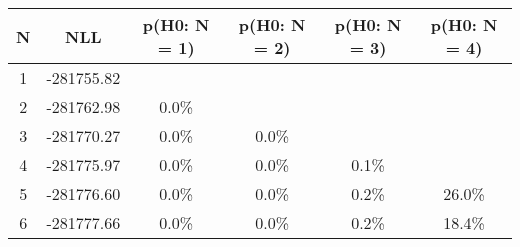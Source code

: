 \begin{table}[htb]
	\begin{center}
{\footnotesize\renewcommand{\arraystretch}{1.4}
		\begin{tabular}{cc||cccc}
			N & NLL & p(H0: N = 1) & p(H0: N = 2) & p(H0: N = 3) & p(H0: N = 4)\\ 
		\hline
1 & -281755.82 & & & & \\
2 & -281762.98 & 0.0\% & & & \\
3 & -281770.27 & 0.0\% & 0.0\% & & \\
4 & -281775.97 & 0.0\% & 0.0\% & 0.1\% & \\
5 & -281776.60 & 0.0\% & 0.0\% & 0.2\% & 26.0\% \\
6 & -281777.66 & 0.0\% & 0.0\% & 0.2\% & 18.4\% \\
	\end{tabular}
		\label{tab:lab}
	}
	\end{center}\end{table}

